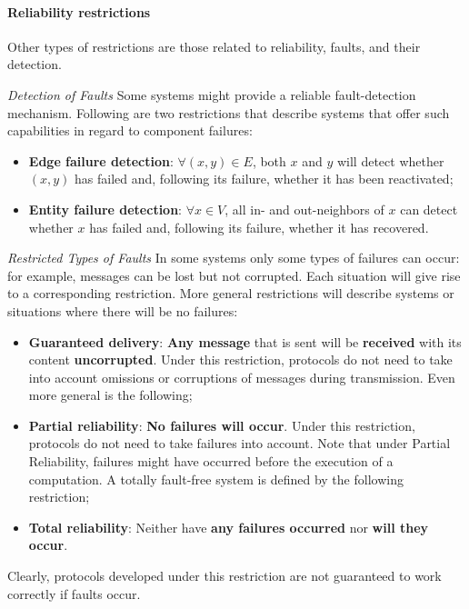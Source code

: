 
\paragraph{Reliability restrictions}
Other types of restrictions are those related to reliability, faults, and their detection.

\textit{Detection of Faults} Some systems might provide a reliable fault-detection mechanism. Following are two restrictions that describe systems that offer such capabilities in regard to component failures:
\begin{itemize}
    \item \textbf{Edge failure detection}: $\forall (x, y) \in  E$, both $x$ and $y$ will detect whether $(x, y)$ has failed and, following its failure, whether it has been reactivated;
    \item \textbf{Entity failure detection}: $\forall x \in V$, all in- and out-neighbors of $x$ can detect whether $x$ has failed and, following its failure, whether it has recovered.
\end{itemize}

\textit{Restricted Types of Faults} In some systems only some types of failures can occur: for example, messages can be lost but not corrupted. Each situation will give rise to a corresponding restriction. More general restrictions will describe systems or situations where there will be no failures:
\begin{itemize}
    \item \textbf{Guaranteed delivery}: \textbf{Any message} that is sent will be \textbf{received} with its content \textbf{uncorrupted}. Under this restriction, protocols do not need to take into account omissions or corruptions of messages during transmission. Even more general is the following;
    \item \textbf{Partial reliability}: \textbf{No failures will occur}. Under this restriction, protocols do not need to take failures into account. Note that under Partial Reliability, failures might have occurred before the execution of a computation. A totally fault-free system is defined by the following restriction;
    \item \textbf{Total reliability}: Neither have \textbf{any failures occurred} nor \textbf{will they occur}. 
\end{itemize}
Clearly, protocols developed under this restriction are not guaranteed to work correctly if faults occur.

